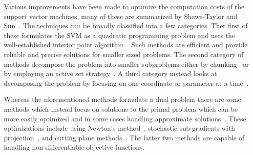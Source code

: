Various improvements have been made to optimize the computation costs of the support vector machines, many of these are summarized by Shawe-Taylor and Sun~\cite{Shawe-TaylorSun2011}.
%
The techniques can be broadly classified into a few categories.
%
Ther first of these formulates the SVM as a quadratic programming problem and uses the well-established interior point algorithm~\cite{BoydVandenberghe2004,FineScheinberg2002,FerrisMunson2002,ScholkopfSmola2001}.
%
Such methods are efficient and provide reliable and precise solutions for smaller sized problems.
%
The second category of methods decompose the problem into smaller subproblems either by chunking~\cite{BordesErtekinWeston2005,ChangLin2011,Joachims1999,OsunaFreundGirosi1997,Platt1998,Vapnik1982,ZanniSerafiniZanghirati2006} or by employing an active set strategy~\cite{CauwenberghsPoggio2000,HastieRossetTibshirani2004,Scheinberg2006,ShiltonPalaniswamiRalph2005}.
%
%
%
A third category instead looks at decomposing the problem by focusing on one
coordinate or parameter at a time~\cite{BordesBottouGallinari2007,FriessCristianiniCampbell1998,HsiehChangLin2008,MangasarianMusicant1999}.

Whereas the aforementioned methods formulate a dual problem there are some methods which instead focus on solutions to the primal problem which can be more easily optimized and in some cases handling approximate solutions~\cite{BottouBousquet2008,Shalev-ShwartzSingerSrebro2011}.
%
These optimizations include using Newton's method~\cite{Chapelle2007,KeerthiDeCoste2005,LeeMangasarian2001,Mangasarian2002}, stochastic sub-gradients with projection~\cite{KivinenSmolaWilliamson2004,Shalev-ShwartzSingerSrebro2011,Zhang2004}, and cutting plane methods~\cite{FrancSonnenburg2008,Joachims2006,TeoSmolaVishwanathan2007}.
%
The latter two methods are capable of handling non-differentiable objective functions.

